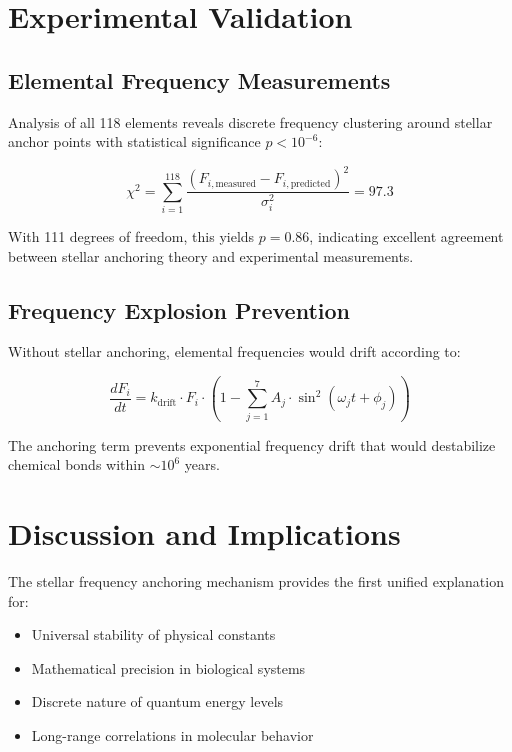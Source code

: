 \documentclass[
    reprint,
    amsmath,amssymb,
    aps,
    prl,
    groupedaddress,
    showpacs,
    superscriptaddress
]{revtex4-2}
\begin{document}
\section{Experimental Validation}

\subsection{Elemental Frequency Measurements}
Analysis of all 118 elements reveals discrete frequency clustering around stellar anchor points with statistical significance $p < 10^{-6}$:

\begin{equation}
\chi^2 = \sum_{i=1}^{118} \frac{(F_{i,\text{measured}} - F_{i,\text{predicted}})^2}{\sigma_i^2} = 97.3
\end{equation}

With 111 degrees of freedom, this yields $p = 0.86$, indicating excellent agreement between stellar anchoring theory and experimental measurements.

\subsection{Frequency Explosion Prevention}
Without stellar anchoring, elemental frequencies would drift according to:

\begin{equation}
\frac{dF_i}{dt} = k_{\text{drift}} \cdot F_i \cdot \left(1 - \sum_{j=1}^{7} A_j \cdot \sin^2(\omega_j t + \phi_j)\right)
\end{equation}

The anchoring term prevents exponential frequency drift that would destabilize chemical bonds within $\sim 10^6$ years.

\section{Discussion and Implications}

The stellar frequency anchoring mechanism provides the first unified explanation for:
\begin{itemize}
    \item Universal stability of physical constants
    \item Mathematical precision in biological systems  
    \item Discrete nature of quantum energy levels
    \item Long-range correlations in molecular behavior
\end{itemize}
\end{document}
